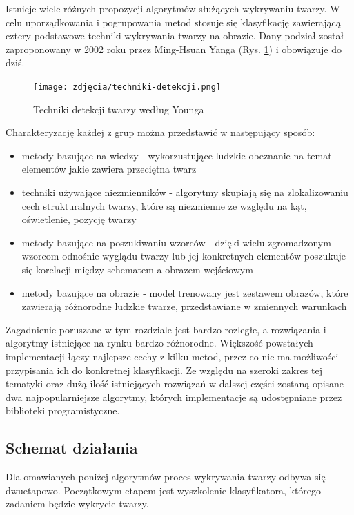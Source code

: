 Istnieje wiele różnych propozycji algorytmów służących wykrywaniu twarzy. W celu uporządkowania i pogrupowania metod stosuje się klasyfikację zawierającą cztery podstawowe techniki wykrywania twarzy na obrazie. Dany podział został zaproponowany w 2002 roku przez Ming-Hsuan Yanga (Rys. \ref{fig:detectionMethods}) i obowiązuje do dziś.

\begin{figure}[h]
	\centering
	\texttt{[image: zdjęcia/techniki-detekcji.png]}
	\caption{Techniki detekcji twarzy według Younga} 
	\label{fig:detectionMethods}
\end{figure}

Charakteryzację każdej z grup \cite{Yang} można przedstawić w następujący sposób:
\begin{itemize}
    \item metody bazujące na wiedzy - wykorzustujące ludzkie obeznanie na temat elementów jakie zawiera przeciętna twarz
    \item techniki używające niezmienników - algorytmy skupiają się na zlokalizowaniu cech strukturalnych twarzy, które są niezmienne ze względu na kąt, oświetlenie, pozycję twarzy
    \item metody bazujące na poszukiwaniu wzorców - dzięki wielu zgromadzonym wzorcom odnośnie wyglądu twarzy lub jej konkretnych elementów poszukuje się korelacji między schematem a obrazem wejściowym
    \item metody bazujące na obrazie - model trenowany jest zestawem obrazów, które zawierają różnorodne ludzkie twarze, przedstawiane w zmiennych warunkach
\end{itemize}

Zagadnienie poruszane w tym rozdziale jest bardzo rozległe, a rozwiązania i algorytmy istniejące na rynku bardzo różnorodne. Większość powstałych implementacji łączy najlepsze cechy z kilku metod, przez co nie ma możliwości przypisania ich do konkretnej klasyfikacji. Ze względu na szeroki zakres tej 
tematyki oraz dużą ilość istniejących rozwiązań w dalszej części zostaną opisane dwa najpopularniejsze algorytmy, których implementacje są udostępniane przez biblioteki programistyczne.


\subsection{Schemat działania}
Dla omawianych poniżej algorytmów proces wykrywania twarzy odbywa się dwuetapowo. Początkowym etapem jest wyszkolenie klasyfikatora, którego zadaniem będzie wykrycie twarzy. 

